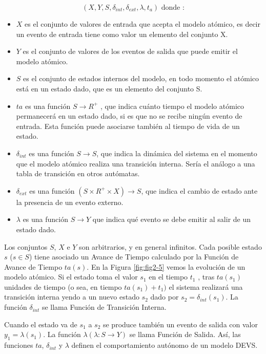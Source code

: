 \documentclass[a4paper,	11pt]{report}
\begin{document}
\begin{equation} 
(X, Y, S, \delta_{int} , \delta_{ext}, \lambda, t_{a}) \mbox{ donde :}
\end{equation}

\begin{itemize}
\item $X$ es el conjunto de valores de entrada que acepta el modelo atómico, es decir un evento de entrada tiene como valor un elemento del conjunto X.
\item $Y$ es el conjunto de valores de los eventos de salida que puede emitir el modelo atómico.
\item $S$ es el conjunto de estados internos del modelo, en todo momento el atómico está en un estado dado, que es un elemento del conjunto S.
\item $ta$ es una función $S \to R^{+}$ , que indica cuánto tiempo el modelo atómico permanecerá en un estado dado, si es que no se recibe ningún evento de entrada. Esta función puede asociarse también al tiempo de vida de un estado.
\item $\delta_{int}$ es una función $S \to S$, que indica la dinámica del sistema en el momento que el modelo atómico realiza una transición interna. Sería el análogo a una tabla de transición en otros autómatas.
\item $\delta_{ext}$ es una función $(S \times R^{+} \times X) \to S$, que indica el cambio de estado ante la presencia de un evento externo.
\item $\lambda$ es una función $S \to Y$ que indica qué evento se debe emitir al salir de un estado dado.
\end{itemize}

Los conjuntos $S$, $X$ e $Y$ son arbitrarios, y en general infinitos. Cada posible estado $s$ ($s \in S$) tiene asociado un Avance de Tiempo calculado por la Función de Avance de Tiempo $ta(s)$.
En la Figura \ref{fig:fig2-5} vemos la evolución de un modelo atómico. Si el estado toma el valor $s_1$ en el tiempo $t_1$ , tras $ta(s_1)$ unidades de tiempo (o sea, en tiempo $ta(s_1 ) + t_1 )$ el sistema realizará una transición interna yendo a un nuevo estado $s_2$ dado por $s_2 = \delta_{int} (s_1 )$. La función $\delta_{int}$ se llama Función de Transición Interna.

Cuando el estado va de $s_1$ a $s_2$ se produce también un evento de salida con valor $y_1 = \lambda(s_1)$. La función $\lambda (\lambda : S \to Y )$ se llama Función de Salida. Así, las funciones $ta$, $\delta_{int}$ y $\lambda$ definen el comportamiento autónomo de un modelo DEVS.
\end{document}
